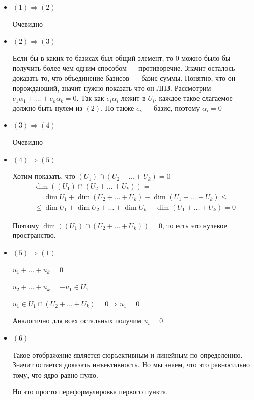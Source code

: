 \begin{itemize}
    \item
        \( (1) \Rightarrow (2) \)

        Очевидно
    \item
        \( (2) \Rightarrow (3) \)

        Если бы в каких-то базисах был общий элемент,
        то \( 0 \) можно было бы получить более чем одним способом --- противоречие.
        Значит осталось доказать то, что объединение базисов --- базис суммы.
        Понятно, что он порождающий, значит нужно показать что он ЛНЗ.
        Рассмотрим \( e_1 \alpha_1 + \ldots + e_k \alpha_k = 0 \).
        Так как \( e_i \alpha_i \) лежит в \( U_i \),
        каждое такое слагаемое должно быть нулем из \( (2) \).
        Но также \( e_i \) --- базис, поэтому \( \alpha_i = 0 \)
    \item
        \( (3) \Rightarrow (4) \)

        Очевидно
    \item
        \( (4) \Rightarrow (5) \)

        Хотим показать, что \( ( U_1 ) \cap (U_2 + \ldots + U_k) = 0 \)
        \begin{gather*}
            \dim (( U_1 ) \cap (U_2 + \ldots + U_k))
            =
            \\
            =
            \dim U_1 + \dim (U_2 + \ldots + U_k) - \dim (U_1 + \ldots + U_k)
            \leq
            \\
            \leq
            \dim U_1 + \dim U_2 + \ldots + \dim U_k - \dim (U_1 + \ldots + U_k)
            =
            0
        \end{gather*}

        Поэтому \( \dim (( U_1 ) \cap (U_2 + \ldots + U_k)) = 0 \),
        то есть это нулевое пространство.
    \item
        \( (5) \Rightarrow (1) \)

        \( u_1 + \ldots + u_k = 0 \)

        \( u_2 + \ldots + u_k = -u_1 \in U_1 \)

        \( u_1 \in U_1 \cap (U_2 + \ldots + U_k) = 0 \Rightarrow u_1 = 0 \)

        Аналогично для всех остальных получим \( u_i = 0 \)
    \item
        \( (6) \)

        Такое отображение является сюръективным и линейным по определению.
        Значит остается доказать инъективность.
        Но мы знаем, что это равносильно тому, что ядро равно нулю.

        Но это просто переформулировка первого пункта.
\end{itemize}

